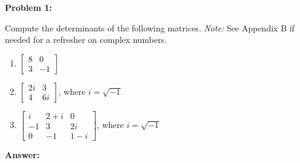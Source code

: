 \documentclass[10pt,letterpaper,final]{report}
\begin{document}
\begin{center}
  \vline
\end{center}

\medskip
\noindent\textbf{Problem 1:}
\medskip

Compute the determinants of the following matrices. \emph{Note:} See Appendix B if needed for a refresher on complex numbers.

\begin{enumerate}[label=(\alph*)]
  \item $\begin{bmatrix}
            8 & 0  \\
            3 & -1
          \end{bmatrix}$
  \item $\begin{bmatrix}
            2i & 3  \\
            4  & 6i
          \end{bmatrix}$, where $i = \sqrt{-1}$
  \item $\begin{bmatrix}
            i  & 2 + i & 0   \\
            -1 & 3     & 2i  \\
            0  & -1    & 1-i
          \end{bmatrix}$, where $i = \sqrt{-1}$
\end{enumerate}

\medskip
\noindent\textbf{Answer:}
\end{document}
